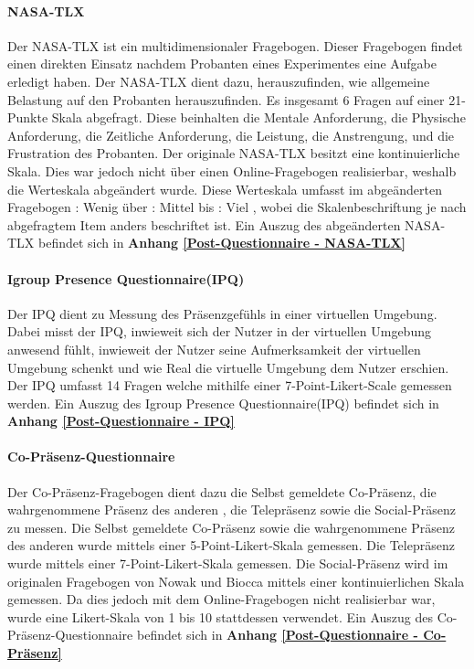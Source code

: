 \documentclass[a4paper,11pt]{article}%
\renewcommand{\\}{\vspace*{0.5\baselineskip} \newline}
\begin{document}
		\paragraph{NASA-TLX}
Der NASA-TLX ist ein multidimensionaler Fragebogen. Dieser Fragebogen findet einen direkten Einsatz nachdem Probanten eines Experimentes eine Aufgabe erledigt haben. Der NASA-TLX dient dazu, herauszufinden, wie allgemeine Belastung auf den Probanten herauszufinden.
Es insgesamt 6 Fragen auf einer 21-Punkte Skala abgefragt. Diese beinhalten die Mentale Anforderung, die Physische Anforderung, die Zeitliche Anforderung, die Leistung, die Anstrengung, und die Frustration des Probanten. \cite{NASATLX}
Der originale NASA-TLX besitzt eine kontinuierliche Skala. Dies war jedoch nicht über einen Online-Fragebogen realisierbar, weshalb die Werteskala abgeändert wurde. Diese Werteskala umfasst im abgeänderten Fragebogen : Wenig \frqq über : Mittel \frqq bis : Viel \frqq, wobei die Skalenbeschriftung je nach abgefragtem Item anders beschriftet ist.
\\Ein Auszug des abgeänderten NASA-TLX befindet sich in \textbf{Anhang \ref{Post-Questionnaire - NASA-TLX}}


		\paragraph{Igroup Presence Questionnaire(IPQ)}
Der IPQ dient zu Messung des Präsenzgefühls in einer virtuellen Umgebung. Dabei misst der IPQ, inwieweit sich der Nutzer in der virtuellen Umgebung anwesend fühlt, inwieweit der Nutzer seine Aufmerksamkeit der virtuellen Umgebung schenkt und wie Real die virtuelle Umgebung dem Nutzer erschien. Der IPQ umfasst 14 Fragen welche mithilfe einer 7-Point-Likert-Scale gemessen werden.
\\Ein Auszug des Igroup Presence Questionnaire(IPQ) befindet sich in \textbf{Anhang \ref{Post-Questionnaire - IPQ}}
		
		\paragraph{Co-Präsenz-Questionnaire}
Der Co-Präsenz-Fragebogen dient dazu die Selbst gemeldete Co-Präsenz, die wahrgenommene Präsenz des \flqq anderen \frqq, die Telepräsenz sowie die Social-Präsenz zu messen. Die Selbst gemeldete Co-Präsenz sowie die wahrgenommene Präsenz des \flqq anderen \frqq wurde mittels einer 5-Point-Likert-Skala gemessen. Die Telepräsenz wurde mittels einer 7-Point-Likert-Skala gemessen. Die Social-Präsenz wird im originalen Fragebogen von Nowak und Biocca mittels einer kontinuierlichen Skala gemessen. Da dies jedoch mit dem Online-Fragebogen nicht realisierbar war, wurde eine Likert-Skala von 1 bis 10 stattdessen verwendet. \citep[p.487]{nowak2004effect}
\\Ein Auszug des Co-Präsenz-Questionnaire befindet sich in \textbf{Anhang \ref{Post-Questionnaire - Co-Präsenz}}
\end{document}
